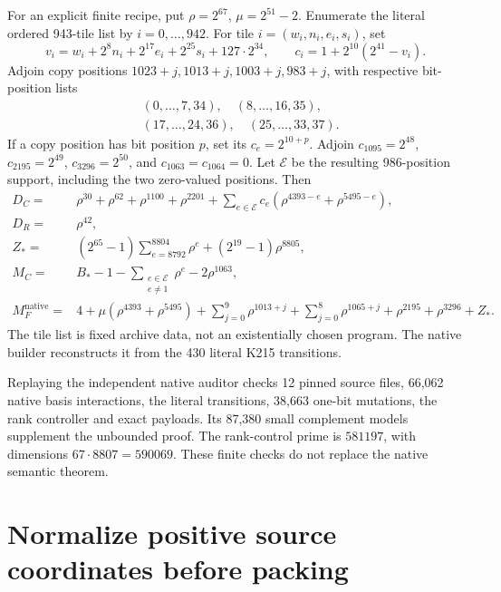 \documentclass[11pt,a4paper]{article}
\theoremstyle{remark}
\begin{document}
For an explicit finite recipe, put \(\rho=2^{67}\), \(\mu=2^{51}-2\).
Enumerate the literal ordered 943-tile list by \(i=0,\ldots,942\).
For tile \(i=(w_i,n_i,e_i,s_i)\), set
\[
 v_i=w_i+2^8n_i+2^{17}e_i+2^{25}s_i+127\cdot2^{34},
 \qquad c_i=1+2^{10}(2^{41}-v_i).
\]
Adjoin copy positions \(1023+j,1013+j,1003+j,983+j\), with respective
bit-position lists
\[
\begin{split}
 &(0,\ldots,7,34),\quad(8,\ldots,16,35),\\
 &(17,\ldots,24,36),\quad(25,\ldots,33,37).
\end{split}
\]
If a copy position has bit position \(p\), set its \(c_e=2^{10+p}\).
Adjoin \(c_{1095}=2^{48}\), \(c_{2195}=2^{49}\),
\(c_{3296}=2^{50}\), and \(c_{1063}=c_{1064}=0\).
Let \(\mathcal E\) be the resulting 986-position support, including
the two zero-valued positions. Then
\begin{align*}
 D_C={}&\rho^{30}+\rho^{62}+\rho^{1100}+\rho^{2201}
       +\sum_{e\in\mathcal E}c_e
        (\rho^{4393-e}+\rho^{5495-e}),\\
 D_R={}&\rho^{42},\\
 Z_\ast={}&(2^{65}-1)\sum_{e=8792}^{8804}\rho^e
                         +(2^{19}-1)\rho^{8805},\\
 M_C={}&B_\ast-1-\sum_{\substack{e\in\mathcal E\\e\ne1}}\rho^e
                         -2\rho^{1063},\\
 M_F^{\mathrm{native}}={}&4+\mu(\rho^{4393}+\rho^{5495})
       +\sum_{j=0}^{9}\rho^{1013+j}
       +\sum_{j=0}^{8}\rho^{1065+j}
       +\rho^{2195}+\rho^{3296}+Z_\ast .
\end{align*}
The tile list is fixed archive data, not an existentially chosen program.
The native builder reconstructs it from the 430 literal K215 transitions.

Replaying the independent native auditor checks 12 pinned source files,
66,062 native basis interactions, the literal transitions,
38,663 one-bit mutations, the rank controller and exact payloads.
Its 87,380 small complement models supplement the unbounded proof.
The rank-control prime is \(581197\), with dimensions
\(67\cdot8807=590069\). These finite checks do not replace the
native semantic theorem.

\section{Normalize positive source coordinates before packing}
\label{sec:source}
\end{document}
